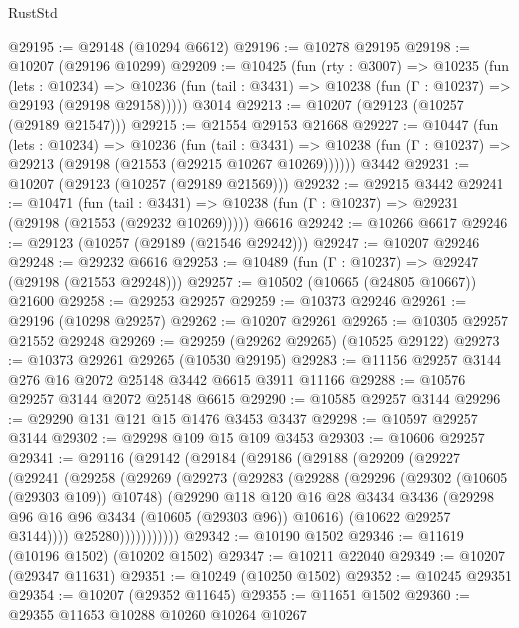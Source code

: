 \begin{lexlean}{RustStd}
\begin{coremodule}
@29195 := @29148 (@10294 @6612)
@29196 := @10278 @29195
@29198 := @10207 (@29196 @10299)
@29209 := @10425
    (fun (rty : @3007) =>
    @10235
      (fun (lets : @10234) =>
      @10236 (fun (tail : @3431) => @10238 (fun (Γ : @10237) => @29193 (@29198 @29158)))))
    @3014
@29213 := @10207 (@29123 (@10257 (@29189 @21547)))
@29215 := @21554 @29153 @21668
@29227 := @10447
    (fun (lets : @10234) =>
    @10236
      (fun (tail : @3431) =>
      @10238 (fun (Γ : @10237) => @29213 (@29198 (@21553 (@29215 @10267 @10269))))))
    @3442
@29231 := @10207 (@29123 (@10257 (@29189 @21569)))
@29232 := @29215 @3442
@29241 := @10471
    (fun (tail : @3431) => @10238 (fun (Γ : @10237) => @29231 (@29198 (@21553 (@29232 @10269)))))
    @6616
@29242 := @10266 @6617
@29246 := @29123 (@10257 (@29189 (@21546 @29242)))
@29247 := @10207 @29246
@29248 := @29232 @6616
@29253 := @10489 (fun (Γ : @10237) => @29247 (@29198 (@21553 @29248)))
@29257 := @10502 (@10665 (@24805 @10667)) @21600
@29258 := @29253 @29257
@29259 := @10373 @29246
@29261 := @29196 (@10298 @29257)
@29262 := @10207 @29261
@29265 := @10305 @29257 @21552 @29248
@29269 := @29259 (@29262 @29265) (@10525 @29122)
@29273 := @10373 @29261 @29265 (@10530 @29195)
@29283 := @11156 @29257 @3144 @276 @16 @2072 @25148 @3442 @6615 @3911 @11166
@29288 := @10576 @29257 @3144 @2072 @25148 @6615
@29290 := @10585 @29257 @3144
@29296 := @29290 @131 @121 @15 @1476 @3453 @3437
@29298 := @10597 @29257 @3144
@29302 := @29298 @109 @15 @109 @3453
@29303 := @10606 @29257
@29341 := @29116
    (@29142
      (@29184
        (@29186
          (@29188
            (@29209
              (@29227
                (@29241
                  (@29258
                    (@29269
                      (@29273
                        (@29283
                          (@29288
                            (@29296
                              (@29302 (@10605 (@29303 @109)) @10748)
                              (@29290
                                @118
                                @120
                                @16
                                @28
                                @3434
                                @3436
                                (@29298 @96 @16 @96 @3434 (@10605 (@29303 @96)) @10616)
                                (@10622 @29257 @3144))))
                          @25280)))))))))))
@29342 := @10190 @1502
@29346 := @11619 (@10196 @1502) (@10202 @1502)
@29347 := @10211 @22040
@29349 := @10207 (@29347 @11631)
@29351 := @10249 (@10250 @1502)
@29352 := @10245 @29351
@29354 := @10207 (@29352 @11645)
@29355 := @11651 @1502
@29360 := @29355 @11653 @10288 @10260 @10264 @10267

\end{coremodule}
\end{lexlean}
